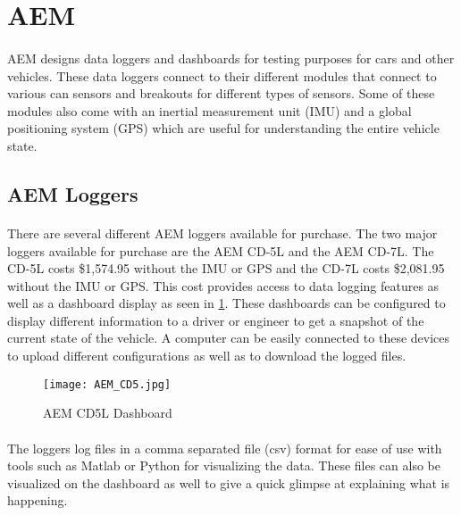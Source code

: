 \section{AEM}

\paragraph{}
AEM \cite{AEMSite} designs data loggers and dashboards for testing purposes for cars and other vehicles.
These data loggers connect to their different modules that connect to various can sensors and breakouts for different types of sensors.
Some of these modules also come with an inertial measurement unit (IMU) and a global positioning system (GPS) which are useful for understanding the entire vehicle state.

\subsection{AEM Loggers}

\paragraph{}
There are several different AEM loggers available for purchase.
The two major loggers available for purchase are the AEM CD-5L and the AEM CD-7L.
The CD-5L costs \$1,574.95 without the IMU or GPS and the CD-7L costs \$2,081.95 without the IMU or GPS.
This cost provides access to data logging features as well as a dashboard display as seen in \cref{fig:AEM_CD5}.
These dashboards can be configured to display different information to a driver or engineer to get a snapshot of the current state of the vehicle.
A computer can be easily connected to these devices to upload different configurations as well as to download the logged files.

\begin{figure}[H]
	\centering
	\texttt{[image: AEM\_CD5.jpg]}
	\caption{AEM CD5L Dashboard}
	\label{fig:AEM_CD5}
\end{figure}

\paragraph{}
The loggers log files in a comma separated file (csv) format for ease of use with tools such as Matlab or Python for visualizing the data.
These files can also be visualized on the dashboard as well to give a quick glimpse at explaining what is happening.

